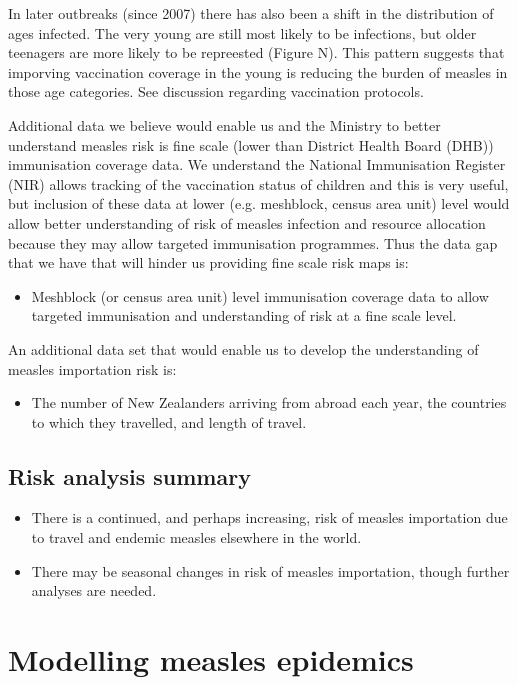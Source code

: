 \documentclass{article}
\begin{document}
In later outbreaks (since 2007) there has also been a shift in the distribution of ages infected. The very young are still most likely to be infections, but older teenagers are more likely to be repreested (Figure N). This pattern suggests that imporving vaccination coverage in the young is reducing the burden of measles in those age categories. See discussion regarding vaccination protocols.

Additional data we believe would enable us and the Ministry to better understand measles risk is fine scale (lower than District Health Board (DHB)) immunisation coverage data. We understand the National Immunisation Register (NIR) allows tracking of the vaccination status of children and this is very useful, but inclusion of these data at lower (e.g. meshblock, census area unit) level would allow better understanding of risk of measles infection and resource allocation because they may allow targeted immunisation programmes. Thus the data gap that we have that will hinder us providing fine scale risk maps is:
\begin{itemize}
\item Meshblock (or census area unit) level immunisation coverage data to allow targeted immunisation and understanding of risk at a fine scale level.
\end {itemize}
An additional data set that would enable us to develop the understanding of measles importation risk is:
\begin {itemize}
\item The number of New Zealanders arriving from abroad each year, the countries to which they travelled, and length of travel.
\end{itemize}

\subsection{Risk analysis summary}
\begin{itemize}
\item There is a continued, and perhaps increasing, risk of measles importation due to travel and endemic measles elsewhere in the world.
\item There may be seasonal changes in risk of measles importation, though further analyses are needed.
\end{itemize}

\section{Modelling measles epidemics}
\label{sec:epidemic_modelling}
\end{document}
